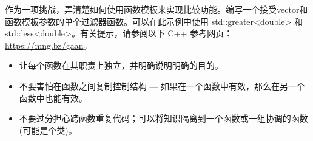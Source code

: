 作为一项挑战，弄清楚如何使用函数模板来实现比较功能。编写一个接受vector和函数模板参数的单个过滤器函数。可以在此示例中使用 std::greater<double> 和 std::less<double>。有关提示，请参阅以下 C++ 参考网页：\url{https://mng.bz/gaan}。


\begin{itemize}
\item
让每个函数在其职责上独立，并明确说明明确的目的。

\item
不要害怕在函数之间复制控制结构 — 如果在一个函数中有效，那么在另一个函数中也能有效。

\item
不要过分担心跨函数重复代码；可以将知识隔离到一个函数或一组协调的函数(可能是个类)。
\end{itemize}
